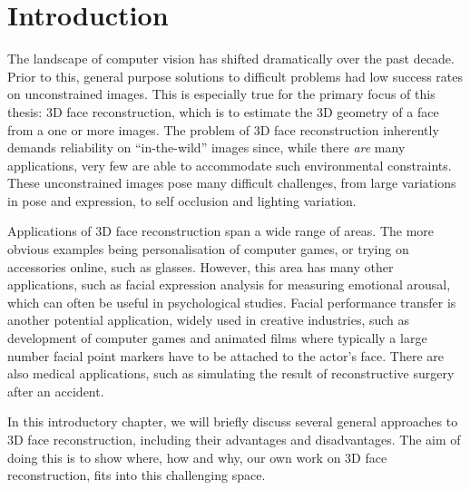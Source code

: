 \chapter{Introduction}

The landscape of computer vision has shifted dramatically over the
past decade. Prior to this, general purpose solutions to difficult
problems had low success rates on unconstrained images. This is
especially true for the primary focus of this thesis: 3D face
reconstruction, which is to estimate the 3D geometry of a face from a
one or more images. The problem of 3D face reconstruction inherently
demands reliability on ``in-the-wild'' images since, while there
\textit{are} many applications, very few are able to accommodate such
environmental constraints. These unconstrained images pose many
difficult challenges, from large variations in pose and expression, to
self occlusion and lighting variation.

Applications of 3D face reconstruction span a wide range of areas. The
more obvious examples being personalisation of computer games, or
trying on accessories online, such as glasses. However, this area has
many other applications, such as facial expression analysis for
measuring emotional arousal, which can often be useful in
psychological studies. Facial performance transfer is another
potential application, widely used in creative industries, such as
development of computer games and animated films where typically a
large number facial point markers have to be attached to the actor's
face. There are also medical applications, such as simulating the
result of reconstructive surgery after an accident.

In this introductory chapter, we will briefly discuss several general
approaches to 3D face reconstruction, including their advantages and
disadvantages. The aim of doing this is to show where, how and why,
our own work on 3D face reconstruction, fits into this challenging space.


